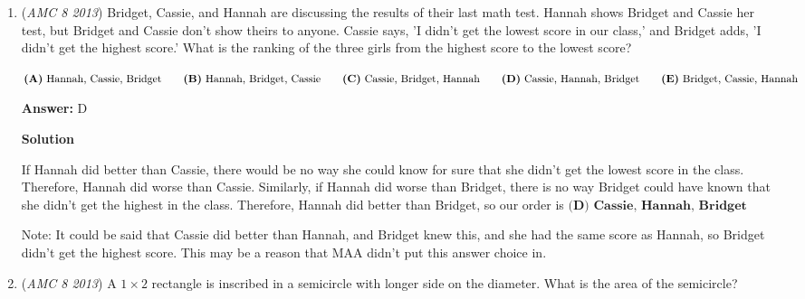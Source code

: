 \begin{enumerate}
We can just calculate the volume of the prism that was cut out of the original $12\times 10\times 5$ box. Each interior side of the fort will be $2$ feet shorter than each side of the outside. Since the floor is $1$ foot, the height will be $4$ feet. So the volume of the interior box is $10\times 8\times 4=320\text{ ft}^3$.

 The volume of the original box is $12\times 10\times 5=600\text{ ft}^3$. Therefore, the number of blocks contained in the fort is $600-320=\boxed{\textbf{(B)}\ 280}$



	\item (\textit{AMC 8 2013}) Bridget, Cassie, and Hannah are discussing the results of their last math test. Hannah shows Bridget and Cassie her test, but Bridget and Cassie don't show theirs to anyone. Cassie says, 'I didn't get the lowest score in our class,' and Bridget adds, 'I didn't get the highest score.' What is the ranking of the three girls from the highest score to the lowest score?


 $\textbf{(A)}\ \text{Hannah, Cassie, Bridget} \qquad \textbf{(B)}\ \text{Hannah, Bridget, Cassie} \\ \qquad \textbf{(C)}\ \text{Cassie, Bridget, Hannah} \qquad \textbf{(D)}\ \text{Cassie, Hannah, Bridget} \\ \qquad \textbf{(E)}\ \text{Bridget, Cassie, Hannah}$

 \textbf{Answer: }D



\textbf{Solution}

If Hannah did better than Cassie, there would be no way she could know for sure that she didn't get the lowest score in the class. Therefore, Hannah did worse than Cassie. Similarly, if Hannah did worse than Bridget, there is no way Bridget could have known that she didn't get the highest in the class. Therefore, Hannah did better than Bridget, so our order is $\boxed{\textbf{(D) Cassie, Hannah, Bridget}}$

 


 Note: It could be said that Cassie did better than Hannah, and Bridget knew this, and she had the same score as Hannah, so Bridget didn't get the highest score. This may be a reason that MAA didn't put this answer choice in.

 


 


	\item (\textit{AMC 8 2013}) A $1\times 2$ rectangle is inscribed in a semicircle with longer side on the diameter. What is the area of the semicircle?



\end{enumerate}
